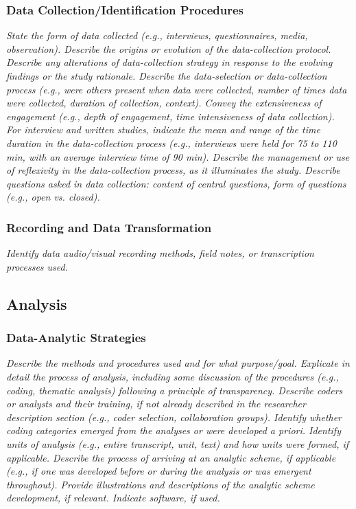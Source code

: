 \documentclass[acmsmall]{acmart}
\begin{document}
\subsubsection{Data Collection/Identification Procedures}

{\em\small State the form of data collected (e.g., interviews, questionnaires, media, observation). Describe the origins or evolution of the data-collection protocol. Describe any alterations of data-collection strategy in response to the evolving findings or the study rationale. Describe the data-selection or data-collection process (e.g., were others present when data were collected, number of times data were collected, duration of collection, context). Convey the extensiveness of engagement (e.g., depth of engagement, time intensiveness of data collection). For interview and written studies, indicate the mean and range of the time duration in the data-collection process (e.g., interviews were held for 75 to 110 min, with an average interview time of 90 min). Describe the management or use of reflexivity in the data-collection process, as it
illuminates the study. Describe questions asked in data collection: content of central questions, form of questions (e.g., open vs. closed). }

\subsubsection{Recording and Data Transformation}

{\em\small Identify data audio/visual recording methods, field notes, or transcription processes used.}

\subsection{Analysis}

\subsubsection{Data-Analytic Strategies}

{\em\small Describe the methods and procedures used and for what purpose/goal. Explicate in detail the process of analysis, including some discussion of the procedures (e.g., coding, thematic analysis) following a principle of transparency. Describe coders or analysts and their training, if not already described in the researcher
description section (e.g., coder selection, collaboration groups). Identify whether coding categories emerged from the analyses or were developed a priori. Identify units of analysis (e.g., entire transcript, unit, text) and how units were formed, if applicable. Describe the process of arriving at an analytic scheme, if applicable (e.g., if one was
developed before or during the analysis or was emergent throughout). Provide illustrations and descriptions of the analytic scheme development, if relevant. Indicate software, if used. }
\end{document}
